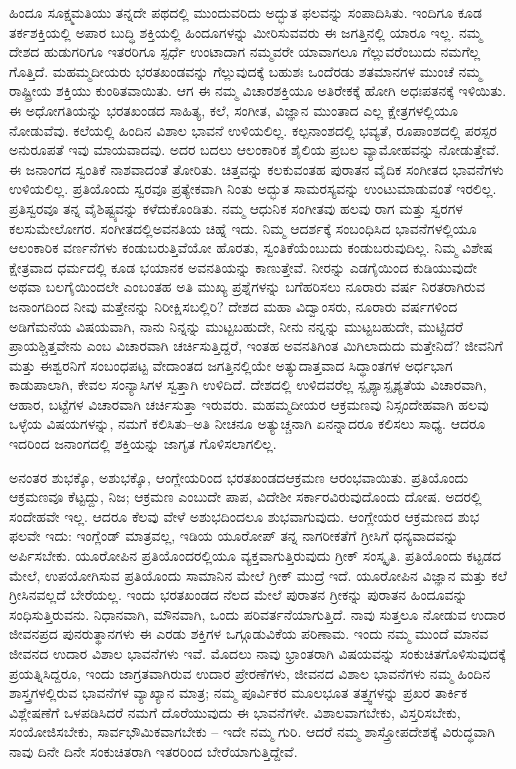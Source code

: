 ಹಿಂದೂ ಸೂಕ್ಷ್ಮಮತಿಯು ತನ್ನದೇ ಪಥದಲ್ಲಿ ಮುಂದುವರಿದು ಅದ್ಭುತ ಫಲವನ್ನು ಸಂಪಾದಿಸಿತು. ಇಂದಿಗೂ ಕೂಡ ತರ್ಕಶಕ್ತಿಯಲ್ಲಿ ಅಪಾರ ಬುದ್ಧಿ ಶಕ್ತಿಯಲ್ಲಿ ಹಿಂದೂಗಳನ್ನು ಮೀರಿಸುವವರು ಈ ಜಗತ್ತಿನಲ್ಲಿ ಯಾರೂ ಇಲ್ಲ. ನಮ್ಮ ದೇಶದ ಹುಡುಗರಿಗೂ ಇತರರಿಗೂ ಸ್ಪರ್ಧೆ ಉಂಟಾದಾಗ ನಮ್ಮವರೇ ಯಾವಾಗಲೂ ಗೆಲ್ಲುವರೆಂಬುದು ನಮಗೆಲ್ಲ ಗೊತ್ತಿದೆ. ಮಹಮ್ಮದೀಯರು ಭರತಖಂಡವನ್ನು ಗೆಲ್ಲುವುದಕ್ಕೆ ಬಹುಶಃ ಒಂದೆರಡು ಶತಮಾನಗಳ ಮುಂಚೆ ನಮ್ಮ ರಾಷ್ಟ್ರೀಯ ಶಕ್ತಿಯು ಕುಂಠಿತವಾಯಿತು. ಆಗ ಈ ನಮ್ಮ ವಿಚಾರಶಕ್ತಿಯೂ ಅತಿರೇಕಕ್ಕೆ ಹೋಗಿ ಅಧಃಪತನಕ್ಕೆ ಇಳಿಯಿತು. ಈ ಅಧೋಗತಿಯನ್ನು ಭರತಖಂಡದ ಸಾಹಿತ್ಯ, ಕಲೆ, ಸಂಗೀತ, ವಿಜ್ಞಾನ ಮುಂತಾದ ಎಲ್ಲ ಕ್ಷೇತ್ರಗಳಲ್ಲಿಯೂ ನೋಡುವೆವು. ಕಲೆಯಲ್ಲಿ ಹಿಂದಿನ ವಿಶಾಲ ಭಾವನೆ ಉಳಿಯಲಿಲ್ಲ. ಕಲ್ಪನಾಂಶದಲ್ಲಿ ಭವ್ಯತೆ, ರೂಪಾಂಶದಲ್ಲಿ ಪರಸ್ಪರ ಅನುರೂಪತೆ ಇವು ಮಾಯವಾದವು. ಅದರ ಬದಲು ಆಲಂಕಾರಿಕ ಶೈಲಿಯ ಪ್ರಬಲ ವ್ಯಾಮೋಹವನ್ನು ನೋಡುತ್ತೇವೆ. ಈ ಜನಾಂಗದ ಸ್ವಂತಿಕೆ ನಾಶವಾದಂತೆ ತೋರಿತು. ಚಿತ್ತವನ್ನು ಕಲಕುವಂತಹ ಪುರಾತನ ವೈದಿಕ ಸಂಗೀತದ ಭಾವನೆಗಳು ಉಳಿಯಲಿಲ್ಲ. ಪ್ರತಿಯೊಂದು ಸ್ವರವೂ ಪ್ರತ್ಯೇಕವಾಗಿ ನಿಂತು ಅದ್ಭುತ ಸಾಮರಸ್ಯವನ್ನು ಉಂಟುಮಾಡುವಂತೆ ಇರಲಿಲ್ಲ. ಪ್ರತಿಸ್ವರವೂ ತನ್ನ ವೈಶಿಷ್ಟ್ಯವನ್ನು ಕಳೆದುಕೊಂಡಿತು. ನಮ್ಮ ಆಧುನಿಕ ಸಂಗೀತವು ಹಲವು ರಾಗ ಮತ್ತು ಸ್ವರಗಳ ಕಲಸುಮೇಲೋಗರ. ಸಂಗೀತದಲ್ಲಿ\break ಅವನತಿಯ ಚಿಹ್ನೆ ಇದು. ನಿಮ್ಮ ಆದರ್ಶಕ್ಕೆ ಸಂಬಂಧಿಸಿದ ಭಾವನೆಗಳಲ್ಲಿಯೂ ಆಲಂಕಾರಿಕ ವರ್ಣನೆಗಳು ಕಂಡುಬರುತ್ತಿವೆಯೋ ಹೊರತು, ಸ್ವಂತಿಕೆಯೆಂಬುದು ಕಂಡುಬರುವುದಿಲ್ಲ. ನಿಮ್ಮ ವಿಶೇಷ ಕ್ಷೇತ್ರವಾದ ಧರ್ಮದಲ್ಲಿ ಕೂಡ ಭಯಾನಕ ಅವನತಿಯನ್ನು ಕಾಣುತ್ತೇವೆ. ನೀರನ್ನು ಎಡಗೈಯಿಂದ ಕುಡಿಯುವುದೇ ಅಥವಾ ಬಲಗೈಯಿಂದಲೇ ಎಂಬಂತಹ ಅತಿ ಮುಖ್ಯ ಪ್ರಶ್ನೆಗಳನ್ನು ಬಗೆಹರಿಸಲು ನೂರಾರು ವರ್ಷ ನಿರತರಾಗಿರುವ ಜನಾಂಗದಿಂದ ನೀವು ಮತ್ತೇನನ್ನು ನಿರೀಕ್ಷಿಸಬಲ್ಲಿರಿ? ದೇಶದ ಮಹಾ ವಿದ್ವಾಂಸರು, ನೂರಾರು ವರ್ಷಗಳಿಂದ ಅಡಿಗೆಮನೆಯ ವಿಷಯವಾಗಿ, ನಾನು ನಿನ್ನನ್ನು ಮುಟ್ಟಬಹುದೇ, ನೀನು ನನ್ನನ್ನು ಮುಟ್ಟಬಹುದೇ, ಮುಟ್ಟಿದರೆ ಪ್ರಾಯಶ್ಚಿತ್ತವೇನು ಎಂಬ ವಿಚಾರವಾಗಿ ಚರ್ಚಿಸುತ್ತಿದ್ದರೆ, ಇಂತಹ ಅವನತಿಗಿಂತ ಮಿಗಿಲಾದುದು ಮತ್ತೇನಿದೆ? ಜೀವನಿಗೆ ಮತ್ತು ಈಶ್ವರನಿಗೆ ಸಂಬಂಧಪಟ್ಟ ವೇದಾಂತದ ಜಗತ್ತಿನಲ್ಲಿಯೇ ಅತ್ಯುದಾತ್ತವಾದ ಸಿದ್ಧಾಂತಗಳ ಅರ್ಧಭಾಗ ಕಾಡುಪಾಲಾಗಿ, ಕೇವಲ ಸಂನ್ಯಾಸಿಗಳ ಸ್ವತ್ತಾಗಿ ಉಳಿದಿದೆ. ದೇಶದಲ್ಲಿ ಉಳಿದವರೆಲ್ಲ ಸ್ಪೃಶ್ಯಾಸ್ಪೃಶ್ಯತೆಯ ವಿಚಾರವಾಗಿ, ಆಹಾರ, ಬಟ್ಟೆಗಳ ವಿಚಾರವಾಗಿ ಚರ್ಚಿಸುತ್ತಾ ಇರುವರು. ಮಹಮ್ಮದೀಯರ ಆಕ್ರಮಣವು ನಿಸ್ಸಂದೇಹವಾಗಿ ಹಲವು ಒಳ್ಳೆಯ ವಿಷಯಗಳನ್ನು, ನಮಗೆ ಕಲಿಸಿತು–ಅತಿ ನೀಚನೂ ಅತ್ಯುಚ್ಚನಾಗಿ ಏನನ್ನಾದರೂ ಕಲಿಸಲು ಸಾಧ್ಯ. ಆದರೂ ಇದರಿಂದ ಜನಾಂಗದಲ್ಲಿ ಶಕ್ತಿಯನ್ನು ಜಾಗೃತ ಗೊಳಿಸಲಾಗಲಿಲ್ಲ.

ಅನಂತರ ಶುಭಕ್ಕೊ, ಅಶುಭಕ್ಕೊ, ಆಂಗ್ಲೇಯರಿಂದ ಭರತಖಂಡದ\break ಆಕ್ರಮಣ ಆರಂಭವಾಯಿತು. ಪ್ರತಿಯೊಂದು ಆಕ್ರಮಣವೂ ಕೆಟ್ಟದ್ದು, ನಿಜ; ಆಕ್ರಮಣ ಎಂಬುದೇ ಪಾಪ, ವಿದೇಶೀ ಸರ್ಕಾರವಿರುವುದೊಂದು ದೋಷ. ಅದರಲ್ಲಿ ಸಂದೇಹವೇ ಇಲ್ಲ. ಆದರೂ ಕೆಲವು ವೇಳೆ ಅಶುಭದಿಂದಲೂ ಶುಭವಾಗುವುದು. ಆಂಗ್ಲೇಯರ ಆಕ್ರಮಣದ ಶುಭ ಫಲವೇ ಇದು: ಇಂಗ್ಲೆಂಡ್​ ಮಾತ್ರವಲ್ಲ, ಇಡಿಯ ಯೂರೋಪ್​ ತನ್ನ ನಾಗರೀಕತೆಗೆ ಗ್ರೀಸಿಗೆ ಧನ್ಯವಾದವನ್ನು ಅರ್ಪಿಸಬೇಕು. ಯೂರೋಪಿನ ಪ್ರತಿಯೊಂದರಲ್ಲಿಯೂ ವ್ಯಕ್ತವಾಗುತ್ತಿರುವುದು ಗ್ರೀಕ್​ ಸಂಸ್ಕೃತಿ. ಪ್ರತಿಯೊಂದು ಕಟ್ಟಡದ ಮೇಲೆ, ಉಪಯೋಗಿಸುವ ಪ್ರತಿಯೊಂದು ಸಾಮಾನಿನ ಮೇಲೆ ಗ್ರೀಕ್​ ಮುದ್ರೆ ಇದೆ. ಯೂರೋಪಿನ ವಿಜ್ಞಾನ ಮತ್ತು ಕಲೆ ಗ್ರೀಸಿನವಲ್ಲದೆ ಬೇರೆಯಲ್ಲ. ಇಂದು ಭರತಖಂಡದ ನೆಲದ ಮೇಲೆ ಪುರಾತನ ಗ್ರೀಕನ್ನು ಪುರಾತನ ಹಿಂದೂವನ್ನು ಸಂಧಿಸುತ್ತಿರುವನು. ನಿಧಾನವಾಗಿ, ಮೌನವಾಗಿ, ಒಂದು ಪರಿವರ್ತನೆಯಾಗುತ್ತಿದೆ. ನಾವು ಸುತ್ತಲೂ ನೋಡುವ ಉದಾರ ಜೀವನಪ್ರದ ಪುನರುತ್ಥಾನಗಳು ಈ ಎರಡು ಶಕ್ತಿಗಳ ಒಗ್ಗೂಡುವಿಕೆಯ ಪರಿಣಾಮ. ಇಂದು ನಮ್ಮ ಮುಂದೆ ಮಾನವ ಜೀವನದ ಉದಾರ ವಿಶಾಲ ಭಾವನೆಗಳು ಇವೆ. ಮೊದಲು ನಾವು ಭ್ರಾಂತರಾಗಿ ವಿಷಯವನ್ನು ಸಂಕುಚಿತಗೊಳಿಸುವುದಕ್ಕೆ ಪ್ರಯತ್ನಿಸಿದ್ದರೂ, ಇಂದು ಜಾಗ್ರತವಾಗಿರುವ ಉದಾರ ಪ್ರೇರಣೆಗಳು, ಜೀವನದ ವಿಶಾಲ ಭಾವನೆಗಳು ನಮ್ಮ ಹಿಂದಿನ ಶಾಸ್ತ್ರಗಳಲ್ಲಿರುವ ಭಾವನೆಗಳ ವ್ಯಾಖ್ಯಾನ ಮಾತ್ರ; ನಮ್ಮ ಪೂರ್ವಿಕರ ಮೂಲಭೂತ ತತ್ತ್ವಗಳನ್ನು ಪ್ರಖರ ತಾರ್ಕಿಕ ವಿಶ್ಲೇಷಣೆಗೆ ಒಳಪಡಿಸಿದರೆ ನಮಗೆ ದೊರೆಯುವುದು ಈ ಭಾವನೆಗಳೇ. ವಿಶಾಲವಾಗಬೇಕು, ವಿಸ್ತರಿಸಬೇಕು, ಸಂಯೋಜಿಸಬೇಕು, ಸಾರ್ವಭೌಮಿಕವಾಗಬೇಕು – ಇದೇ ನಮ್ಮ ಗುರಿ. ಆದರೆ ನಮ್ಮ ಶಾಸ್ತ್ರೋಪದೇಶಕ್ಕೆ ವಿರುದ್ಧವಾಗಿ ನಾವು ದಿನೇ ದಿನೇ ಸಂಕುಚಿತರಾಗಿ ಇತರರಿಂದ ಬೇರೆಯಾಗುತ್ತಿದ್ದೇವೆ.


